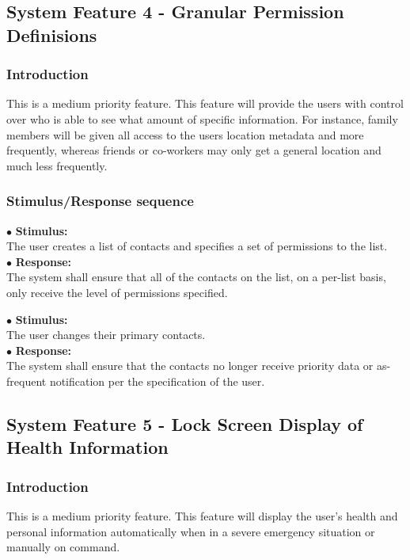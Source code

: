 \documentclass{scrreprt}
\begin{document}
\subsection{System Feature 4 - Granular Permission Definisions}
\subsubsection{Introduction}
This is a medium priority feature. This feature will provide the users with control over who is able to see what amount of specific information. For instance, family members will be given all access to the users location metadata and more frequently, whereas friends or co-workers may only get a general location and much less frequently.

\subsubsection{Stimulus/Response sequence}
\vspace{4mm}
	$\bullet$ \textbf{Stimulus:} \\ \hspace{5mm} The user creates a list of contacts and specifies a set of permissions to the list. \\
	$\bullet$ \textbf{Response:} \\ \hspace{5mm} The system shall ensure that all of the contacts on the list, on a per-list basis, only receive the level of permissions specified. 

\vspace{4mm}
	\hspace{-4.75mm} $\bullet$ \textbf{Stimulus:} \\ \hspace{5mm} The user changes their primary contacts. \\
	$\bullet$ \textbf{Response:} \\ \hspace{5mm} The system shall ensure that the contacts no longer receive priority data or as-frequent notification per the specification of the user.


\subsection{System Feature 5 - Lock Screen Display of Health Information}
\subsubsection{Introduction}
This is a medium priority feature. This feature will display the user's health and personal information automatically when in a severe emergency situation or manually on command.
\end{document}
